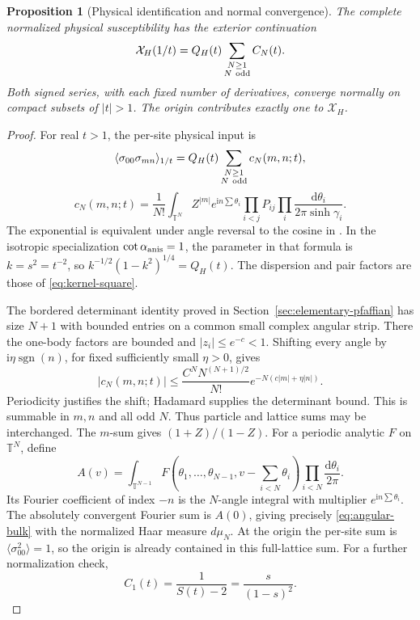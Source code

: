 \documentclass[11pt]{article}
\numberwithin{equation}{section}
\newtheorem{proposition}[theorem]{Proposition}
\theoremstyle{remark}\newtheorem{remark}[theorem]{Remark}
\newcommand{\ii}{\mathrm i}
\newcommand{\dd}{\mathrm d}
\newcommand{\T}{\mathbb T}
\newcommand{\X}{\mathcal X_H}
\begin{document}
\begin{proposition}[Physical identification and normal convergence]
\label{prop:angular-bulk}
The complete normalized physical susceptibility has the exterior
continuation
\begin{equation}\label{eq:bulk}
 \X(1/t)=Q_H(t)\sum_{\substack{N\ge1\\N\ {\rm odd}}} C_N(t).
\end{equation}
Both signed series, with each fixed number of derivatives, converge
normally on compact subsets of $|t|>1$.
The origin contributes exactly one to $\X$.
\end{proposition}
\begin{proof}
For real $t>1$, the per-site physical input is
\[
 \langle\sigma_{00}\sigma_{mn}\rangle_{1/t}
  =Q_H(t)\sum_{\substack{N\ge1\\N\ {\rm odd}}}c_N(m,n;t),
\]
\[
 c_N(m,n;t)=\frac1{N!}\int_{\T^N}
 Z^{|m|}e^{\ii n\sum\theta_i}\prod_{i<j}P_{ij}
                   \prod_i\frac{\dd\theta_i}{2\pi\sinh\gamma_i}.
\]
The exponential is equivalent under angle reversal to the cosine
in \cite[eq.~(4.2)]{Orrick}. In the isotropic specialization
$\cot\alpha_{\rm anis}=1$, the parameter in that formula is
$k=s^2=t^{-2}$, so $k^{-1/2}(1-k^2)^{1/4}=Q_H(t)$.
The dispersion and pair factors are those of \eqref{eq:kernel-square}.

The bordered determinant identity proved in
Section~\ref{sec:elementary-pfaffian} has size $N+1$ with bounded
entries on a common small complex angular strip. There the
one-body factors are bounded and $|z_i|\le e^{-c}<1$.
Shifting every angle by $\ii\eta\operatorname{sgn}(n)$, for
fixed sufficiently small $\eta>0$, gives
\[
 |c_N(m,n;t)|\le \frac{C^N N^{(N+1)/2}}{N!}
                   e^{-N(c|m|+\eta|n|)}.
\]
Periodicity justifies the shift; Hadamard supplies the determinant
bound. This is summable in $m,n$ and all odd $N$.
Thus particle and lattice sums may be interchanged.
The $m$-sum gives $(1+Z)/(1-Z)$.
For a periodic analytic $F$ on $\T^N$, define
\[
 A(v)=\int_{\T^{N-1}}
 F(\theta_1,\ldots,\theta_{N-1},v-\textstyle\sum_{i<N}\theta_i)
                   \prod_{i<N}\frac{\dd\theta_i}{2\pi}.
\]
Its Fourier coefficient of index $-n$ is the $N$-angle integral
with multiplier $e^{\ii n\sum\theta_i}$.
The absolutely convergent Fourier sum is $A(0)$, giving precisely
\eqref{eq:angular-bulk} with the normalized Haar measure $d\mu_N$.
At the origin the per-site sum is $\langle\sigma_{00}^2\rangle=1$,
so the origin is already contained in this full-lattice sum.
For a further normalization check,
\[
 C_1(t)=\frac1{S(t)-2}=\frac{s}{(1-s)^2}.
\]


\end{proof}
\end{document}
